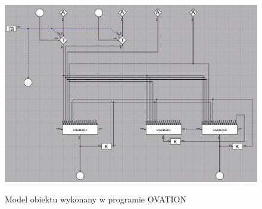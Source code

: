 \begin{figure}[h!]
	\centering
	\includegraphics[width=\linewidth]{img/MODEL.png}
	\label{ch1:model}
	\caption{Model obiektu wykonany w programie OVATION}
\end{figure}
